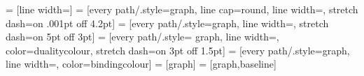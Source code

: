\newcommand\namedleaf[1]{ node[leaf] (#1) {} }%
\newcommand\leafsep[1]{ node[leaf]{} edge from parent[{_[sep=#1]}-] }%
\newcommand\leaf{ node[leaf]{} } %
\newcommand\namedleaflab[2] {  node[leaf, label={[label distance=1pt]{-90}:${#1}$}] (#2) {} } 
\newcommand\leaflab[1] {\namedleaflab{#1}{leaf}}
\newcommand\leaflabsep[2] {%
node[leaf, label={[label distance=1pt]{-90}:${#1}$}]{} edge from parent[{_[sep=#2]}-]
}
\newcommand\unionroot{\node[circle] {$\graphunion$}}%
\newcommand\joinroot{\node[circle] {$\graphjoin$}}
\newcommand\unionnode{node[circle] {$\graphunion$}}
\newcommand\joinnode{node[circle] {$\graphjoin$}}
\newcommand\namedunionnode[1]{node[circle] (#1) {$\graphunion$}}
\newcommand\namedjoinnode[1]{node[circle] (#1) {$\graphjoin$}}
\newcommand\dummyleaf{ edge from parent[draw=none] }





        = [line width=\linewd]
       = 
 [every path/.style={graph, line cap=round, line width=\fibrewidth, stretch dash=on .001pt off 4.2pt}]
         = [every path/.style={graph, line width=\leapwidth, stretch dash=on 5pt off 3pt}]
      = 
 [every path/.style=
  {graph, line width=\dualitywidth, color=dualitycolour, stretch dash=on 3pt off 1.5pt}]
      = [every path/.style={graph, line width=\dualitywidth, color=bindingcolour}]
   = [graph]
 = [graph,baseline]


\newcommand\fibheight{2}




\def\lo{.13}%
\def\mi{.23}%
\def\hi{.33}%
\def\vi{.53}%


